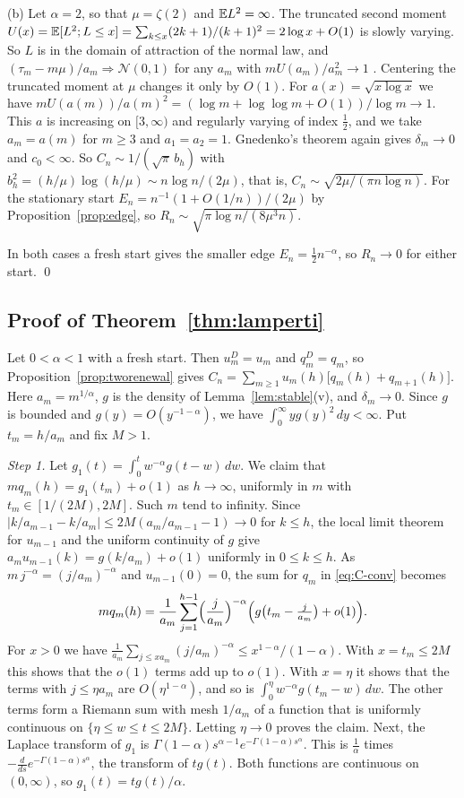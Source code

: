 (b) Let $\alpha=2$, so that $\mu=\zeta(2)$ and $\mathbb{E} L^2=\infty$. The truncated
second moment $U(x)=\mathbb{E}[L^2;L\le x]=\sum_{k\le x}(2k+1)/(k+1)^2=2\log x+O(1)$
is slowly varying. So $L$ is in the domain of attraction of the normal law,
and $(\tau_m-m\mu)/a_m\Rightarrow\mathcal N(0,1)$ for any $a_m$ with
$mU(a_m)/a_m^2\to1$ \cite{ibragimovlinnik1971}. Centering the truncated
moment at $\mu$ changes it only by $O(1)$. For $a(x)=\sqrt{x\log x}$ we have
$mU(a(m))/a(m)^2=(\log m+\log\log m+O(1))/\log m\to1$. This $a$ is
increasing on $[3,\infty)$ and regularly varying of index $\frac12$, and we
take $a_m=a(m)$ for $m\ge3$ and $a_1=a_2=1$. Gnedenko's theorem again gives
$\delta_m\to0$ and $c_0<\infty$. So $C_n\sim1/(\sqrt\pi\,b_h)$ with
$b_h^2=(h/\mu)\log(h/\mu)\sim n\log n/(2\mu)$, that is,
$C_n\sim\sqrt{2\mu/(\pi n\log n)}$. For the stationary start
$E_n=n^{-1}(1+O(1/n))/(2\mu)$ by Proposition~\ref{prop:edge}, so
$R_n\sim\sqrt{\pi\log n/(8\mu^3n)}$.

In both cases a fresh start gives the smaller edge $E_n=\frac12n^{-\alpha}$, so
$R_n\to0$ for either start.
\qed

\subsection{Proof of Theorem~\texorpdfstring{\ref{thm:lamperti}}{4.7}}

Let $0<\alpha<1$ with a fresh start. Then $u^D_m=u_m$ and $q^D_m=q_m$, so
Proposition~\ref{prop:tworenewal} gives
$C_n=\sum_{m\ge1}u_m(h)\bigl[q_m(h)+q_{m+1}(h)\bigr]$. Here
$a_m=m^{1/\alpha}$, $g$ is the density of Lemma~\ref{lem:stable}(v), and
$\delta_m\to0$. Since $g$ is bounded and $g(y)=O(y^{-1-\alpha})$, we have
$\int_0^\infty yg(y)^2\,dy<\infty$. Put $t_m=h/a_m$ and fix $M>1$.

\emph{Step 1.} Let $g_1(t)=\int_0^tw^{-\alpha}g(t-w)\,dw$. We claim that
$mq_m(h)=g_1(t_m)+o(1)$ as $h\to\infty$, uniformly in $m$ with
$t_m\in[1/(2M),2M]$. Such $m$ tend to infinity. Since
$\lvert k/a_{m-1}-k/a_m\rvert\le2M(a_m/a_{m-1}-1)\to0$ for $k\le h$, the
local limit theorem for $u_{m-1}$ and the uniform continuity of $g$ give
$a_mu_{m-1}(k)=g(k/a_m)+o(1)$ uniformly in $0\le k\le h$. As
$m\,j^{-\alpha}=(j/a_m)^{-\alpha}$ and $u_{m-1}(0)=0$, the sum for $q_m$ in
\eqref{eq:C-conv} becomes
\[
mq_m(h)=\frac1{a_m}\sum_{j=1}^{h-1}\Bigl(\frac j{a_m}\Bigr)^{-\alpha}
\Bigl(g\bigl(t_m-\tfrac j{a_m}\bigr)+o(1)\Bigr).
\]
For $x>0$ we have
$\frac1{a_m}\sum_{j\le xa_m}(j/a_m)^{-\alpha}\le x^{1-\alpha}/(1-\alpha)$.
With $x=t_m\le2M$ this shows that the $o(1)$ terms add up to $o(1)$. With
$x=\eta$ it shows that the terms with $j\le\eta a_m$ are $O(\eta^{1-\alpha})$,
and so is $\int_0^\eta w^{-\alpha}g(t_m-w)\,dw$. The other terms form a
Riemann sum with mesh $1/a_m$ of a function that is uniformly continuous on
$\{\eta\le w\le t\le2M\}$. Letting $\eta\to0$ proves the claim. Next, the
Laplace transform of $g_1$ is
$\Gamma(1-\alpha)s^{\alpha-1}e^{-\Gamma(1-\alpha)s^\alpha}$. This is
$\frac1\alpha$ times $-\frac d{ds}e^{-\Gamma(1-\alpha)s^\alpha}$, the
transform of $tg(t)$. Both functions are continuous on $(0,\infty)$, so
$g_1(t)=tg(t)/\alpha$.

